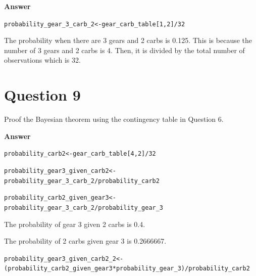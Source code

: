 \documentclass{article}\usepackage[]{graphicx}\usepackage[]{color}
\makeatletter
\newcommand{\hlnum}[1]{\textcolor[rgb]{0.686,0.059,0.569}{#1}}%
\newcommand{\hlopt}[1]{\textcolor[rgb]{0,0,0}{#1}}%
\newcommand{\hlstd}[1]{\textcolor[rgb]{0.345,0.345,0.345}{#1}}%
\newcommand{\hlkwb}[1]{\textcolor[rgb]{0.69,0.353,0.396}{#1}}%
\newenvironment{kframe}{%
 \def\at@end@of@kframe{}%
 \ifinner\ifhmode%
  \def\at@end@of@kframe{\end{minipage}}%
  \begin{minipage}{\columnwidth}%
 \fi\fi%
 \def\FrameCommand##1{\hskip\@totalleftmargin \hskip-\fboxsep
 \colorbox{shadecolor}{##1}\hskip-\fboxsep
     \hskip-\linewidth \hskip-\@totalleftmargin \hskip\columnwidth}%
 \MakeFramed {\advance\hsize-\width
   \@totalleftmargin\z@ \linewidth\hsize
   \@setminipage}}%
 {\par\unskip\endMakeFramed%
 \at@end@of@kframe}
\newenvironment{knitrout}{}{} %
\makeatother
\begin{document}
\textbf{Answer}\\
\begin{knitrout}
\color{fgcolor}\begin{kframe}
\begin{alltt}
\hlstd{probability_gear_3_carb_2} \hlkwb{<-} \hlstd{gear_carb_table[}\hlnum{1}\hlstd{,}\hlnum{2}\hlstd{]}\hlopt{/}\hlnum{32}
\end{alltt}
\end{kframe}
\end{knitrout}

The probability when there are 3 gears and 2 carbs is 0.125. This is because the number of 3 gears and 2 carbs is 4. Then, it is divided by the total number of observations which is 32. 


\section{Question 9}
Proof the Bayesian theorem using the contingency table in Question 6.

\textbf{Answer}\\
\begin{knitrout}
\color{fgcolor}\begin{kframe}
\begin{alltt}
\hlstd{probability_carb2} \hlkwb{<-} \hlstd{gear_carb_table[}\hlnum{4}\hlstd{,}\hlnum{2}\hlstd{]} \hlopt{/} \hlnum{32}

\hlstd{probability_gear3_given_carb2} \hlkwb{<-}
  \hlstd{probability_gear_3_carb_2}\hlopt{/}\hlstd{probability_carb2}

\hlstd{probability_carb2_given_gear3} \hlkwb{<-}
  \hlstd{probability_gear_3_carb_2}\hlopt{/}\hlstd{probability_gear_3}
\end{alltt}
\end{kframe}
\end{knitrout}

The probability of gear 3 given 2 carbs is 0.4.

The probability of 2 carbs given gear 3 is 0.2666667.

\begin{knitrout}
\color{fgcolor}\begin{kframe}
\begin{alltt}
\hlstd{probability_gear3_given_carb2_2} \hlkwb{<-}
  \hlstd{(probability_carb2_given_gear3}\hlopt{*}\hlstd{probability_gear_3)}\hlopt{/}\hlstd{probability_carb2}
\end{alltt}
\end{kframe}
\end{knitrout}
\end{document}

